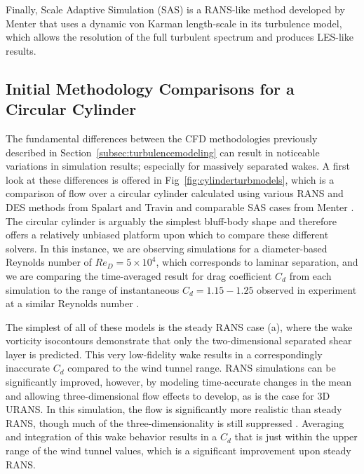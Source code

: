 \documentclass[journal]{new-aiaa}
\begin{document}
Finally, Scale Adaptive Simulation (SAS) is a RANS-like method developed by Menter \cite{menter2005scaleadaptive} that uses a dynamic von Karman length-scale in its turbulence model, which allows the resolution of the full turbulent spectrum and produces LES-like results.











\subsection{Initial Methodology Comparisons for a Circular Cylinder} \label{subsec:initialcompare}

The fundamental differences between the CFD methodologies previously described in Section~\ref{subsec:turbulencemodeling} can result in noticeable variations in simulation results; especially for massively separated wakes. A first look at these differences is offered in Fig~\ref{fig:cylinderturbmodels}, which is a comparison of flow over a circular cylinder calculated using various RANS and DES methods from Spalart and Travin \cite{spalart2009detachededdy} and comparable SAS cases from Menter \cite{menter2005scaleadaptive}. The circular cylinder is arguably the simplest bluff-body shape and therefore offers a relatively unbiased platform upon which to compare these different solvers. In this instance, we are observing simulations for a diameter-based Reynolds number of $Re_D = 5 \times 10^4$, which corresponds to laminar separation, and we are comparing the time-averaged result for drag coefficient $C_d$ from each simulation to the range of instantaneous $C_d=1.15-1.25$ observed in experiment at a similar Reynolds number \cite{travin2000detachededdy}.


The simplest of all of these models is the steady RANS case (a), where the wake vorticity isocontours demonstrate that only the two-dimensional separated shear layer is predicted. This very low-fidelity wake results in a correspondingly inaccurate $C_d$ compared to the wind tunnel range. RANS simulations can be significantly improved, however, by modeling time-accurate changes in the mean and allowing three-dimensional flow effects to develop, as is the case for 3D URANS.  In this simulation, the flow is significantly more realistic than steady RANS, though much of the three-dimensionality is still suppressed \cite{spalart2009detachededdy}.  Averaging and integration of this wake behavior results in a $C_d$ that is just within the upper range of the wind tunnel values, which is a significant improvement upon steady RANS.
\end{document}
